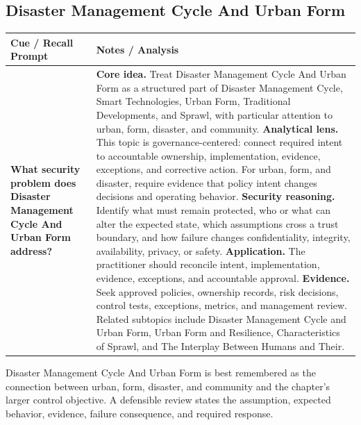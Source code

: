 \documentclass[11pt]{article}
\newcommand{\CornellHeader}{%
\rowcolor{Navy}\color{white}\bfseries Cue / Recall Prompt & \color{white}\bfseries Notes / Analysis\\\hline}
\newcommand{\CornellRow}[2]{%
\cellcolor{CueGray}\RaggedRight\textbf{#1} & \RaggedRight #2\\\hline}
\begin{document}
\subsection*{Disaster Management Cycle And Urban Form}
\begin{longtable}{>{\RaggedRight\arraybackslash}p{}|>{\RaggedRight\arraybackslash}p{}}
\CornellHeader
\CornellRow{What security problem does Disaster Management Cycle And Urban Form address?}{\textbf{Core idea.} Treat Disaster Management Cycle And Urban Form as a structured part of Disaster Management Cycle, Smart Technologies, Urban Form, Traditional Developments, and Sprawl, with particular attention to urban, form, disaster, and community. \textbf{Analytical lens.} This topic is governance-centered: connect required intent to accountable ownership, implementation, evidence, exceptions, and corrective action. For urban, form, and disaster, require evidence that policy intent changes decisions and operating behavior. \textbf{Security reasoning.} Identify what must remain protected, who or what can alter the expected state, which assumptions cross a trust boundary, and how failure changes confidentiality, integrity, availability, privacy, or safety. \textbf{Application.} The practitioner should reconcile intent, implementation, evidence, exceptions, and accountable approval. \textbf{Evidence.} Seek approved policies, ownership records, risk decisions, control tests, exceptions, metrics, and management review. Related subtopics include Disaster Management Cycle and Urban Form, Urban Form and Resilience, Characteristics of Sprawl, and The Interplay Between Humans and Their.}
\end{longtable}
\begin{topicsummary}
Disaster Management Cycle And Urban Form is best remembered as the connection between urban, form, disaster, and community and the chapter's larger control objective. A defensible review states the assumption, expected behavior, evidence, failure consequence, and required response.
\end{topicsummary}
\end{document}
